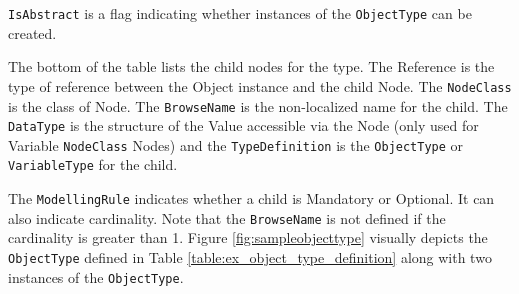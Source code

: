 \texttt{IsAbstract} is a flag indicating whether instances of the \texttt{ObjectType} can be created.

The bottom of the table lists the child nodes for the type. The Reference is the type of reference between the Object instance and the child Node. The \texttt{NodeClass} is the class of Node. The \texttt{BrowseName} is the non-localized name for the child. The \texttt{DataType} is the structure of the Value accessible via the Node (only used for Variable \texttt{NodeClass} Nodes) and the \texttt{TypeDefinition} is the \texttt{ObjectType} or \texttt{VariableType} for the child. 

The \texttt{ModellingRule} indicates whether a child is Mandatory or Optional. It can also indicate cardinality. Note that the \texttt{BrowseName} is not defined if the cardinality is greater than 1. Figure \ref{fig:sampleobjecttype} visually depicts the \texttt{ObjectType} defined in Table \ref{table:ex_object_type_definition} along with two instances of the \texttt{ObjectType}.


\FloatBarrier

